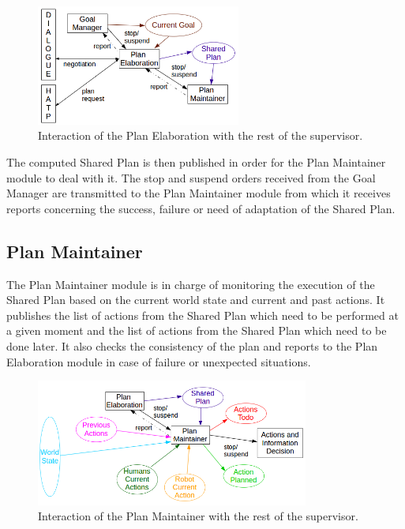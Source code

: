 \documentclass[english,a4paper,11pt,twoside]{StyleThese}
\begin{document}
\begin{figure}[!h]
	\centering
    \includegraphics[width=0.6\textwidth]{figs/Chapter2/PlanElaboration.png}
    \caption{Interaction of the Plan Elaboration with the rest of the supervisor.}
    \label{fig:planElaboration}
\end{figure}

The computed Shared Plan is then published in order for the Plan Maintainer module to deal with it. The stop and suspend orders received from the Goal Manager are transmitted to the Plan Maintainer module from which it receives reports concerning the success, failure or need of adaptation of the Shared Plan.

\subsection{Plan Maintainer}

The Plan Maintainer module is in charge of monitoring the execution of the Shared Plan based on the current world state and current and past actions. It publishes the list of actions from the Shared Plan which need to be performed at a given moment and the list of actions from the Shared Plan which need to be done later. It also checks the consistency of the plan and reports to the Plan Elaboration module in case of failure or unexpected situations.

\begin{figure}[!h]
	\centering
    \includegraphics[width=0.8\textwidth]{figs/Chapter2/PlanMaintainer.png}
    \caption{Interaction of the Plan Maintainer with the rest of the supervisor.}
    \label{fig:planMaintainer}
\end{figure}
\end{document}
